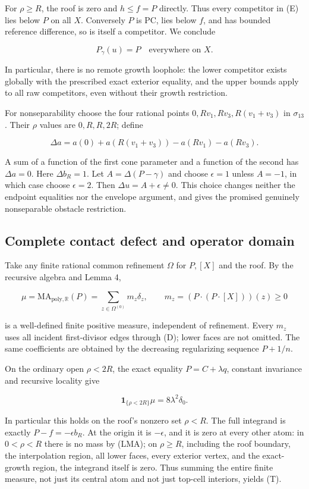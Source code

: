 \documentclass[
  10pt,
]{article}
\begin{document}
For \(\rho\geq R\), the roof is zero and \(h\leq f=P\) directly. Thus
every competitor in (E) lies below \(P\) on all \(X\). Conversely \(P\)
is PC, lies below \(f\), and has bounded reference difference, so is
itself a competitor. We conclude

\[
P_\gamma(u)=P\quad\text{everywhere on }X. \tag{EP}
\]

In particular, there is no remote growth loophole: the lower competitor
exists globally with the prescribed exact exterior equality, and the
upper bounds apply to all raw competitors, even without their growth
restriction.

For nonseparability choose the four rational points
\(0,Rv_1,Rv_3,R(v_1+v_3)\) in \(\sigma_{13}\). Their \(\rho\) values are
\(0,R,R,2R\); define

\[
\Delta a=a(0)+a(R(v_1+v_3))-a(Rv_1)-a(Rv_3).
\]

A sum of a function of the first cone parameter and a function of the
second has \(\Delta a=0\). Here \(\Delta b_R=1\). Let
\(A=\Delta(P-\gamma)\) and choose \(\epsilon=1\) unless \(A=-1\), in
which case choose \(\epsilon=2\). Then \(\Delta u=A+\epsilon\ne0\). This
choice changes neither the endpoint equalities nor the envelope
argument, and gives the promised genuinely nonseparable obstacle
restriction.

\subsection{Complete contact defect and operator
domain}\label{complete-contact-defect-and-operator-domain}

Take any finite rational common refinement \(\Omega\) for \(P,[X]\) and
the roof. By the recursive algebra and Lemma 4,

\[
\mu=\mathrm{MA}_{\mathrm{poly},\mathbb R}(P)
=\sum_{z\in\Omega^{(0)}}m_z\delta_z,
\qquad m_z=(P\cdot(P\cdot[X]))(z)\geq0
\]

is a well-defined finite positive measure, independent of refinement.
Every \(m_z\) uses all incident first-divisor edges through (D); lower
faces are not omitted. The same coefficients are obtained by the
decreasing regularizing sequence \(P+1/n\).

On the ordinary open \(\rho<2R\), the exact equality \(P=C+\lambda q\),
constant invariance and recursive locality give

\[
\mathbf1_{\{\rho<2R\}}\mu=8\lambda^2\delta_0. \tag{LMA}
\]

In particular this holds on the roof's nonzero set \(\rho<R\). The full
integrand is exactly \(P-f=-\epsilon b_R\). At the origin it is
\(-\epsilon\), and it is zero at every other atom: in \(0<\rho<R\) there
is no mass by (LMA); on \(\rho\geq R\), including the roof boundary, the
interpolation region, all lower faces, every exterior vertex, and the
exact-growth region, the integrand itself is zero. Thus summing the
entire finite measure, not just its central atom and not just top-cell
interiors, yields (T).
\end{document}
